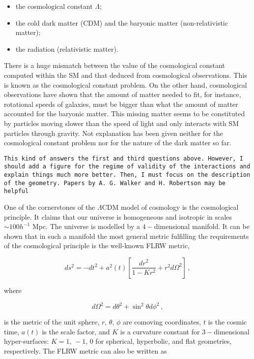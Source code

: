 \begin{itemize}
\item the cosmological constant $\Lambda$;
\item the cold dark matter (CDM) and the baryonic matter (non-relativistic matter);
\item the radiation (relativistic matter).
\end{itemize}

There is a huge mismatch between the value of the cosmological constant computed within the SM and that deduced from cosmological observations. This is known as the cosmological constant problem. On the other hand, cosmological observations have shown that the amount of matter needed to fit, for instance, rotational speeds of galaxies, must be bigger than what the amount of matter accounted for the baryonic matter. This missing matter seems to be constituted by particles moving slower than the speed of light and only interacts with SM particles through gravity. Not explanation has been given neither for the cosmological constant problem nor for the nature of the dark matter so far. 

\texttt{This kind of answers the first and third questions above. However, I should add a figure for the regime of validity of the interactions and explain things much more better. Then, I must focus on the description of the geometry. Papers by A. G. Walker and H. Robertson may be helpful}

One of the cornerstones of the $ \Lambda $CDM model of cosmology is the cosmological principle. It claims that our universe is homogeneous and isotropic in scales $ \sim 100 h^{-1} $ Mpc. The universe is modelled by a $ 4- $dimensional manifold. It can be shown that in such a manifold the most general metric fulfilling the requirements of the cosmological principle is the well-known FLRW metric,


\begin{equation}
ds^2=-dt^2+a^2(t)\left[\frac{dr^2}{1-K r^2}+r^2d\Omega^2\right] \, , 
\label{equation:1.2.1}
\end{equation}

where

\begin{equation}
d\Omega^2=d\theta^2+\sin^2\theta d\phi^2 \, ,
\label{equation:1.2.2}
\end{equation}

is the metric of the unit sphere, $ r,\, \theta,\,\phi $ are comoving coordinates, $ t $ is the cosmic time, $ a(t) $ is the scale factor, and $ K $ is a curvature constant for $ 3- $dimensional hyper-surfaces: $ K=1,\, -1,\, 0 $ for spherical, hyperbolic, and flat geometries, respectively. The FLRW metric can also be written as  

